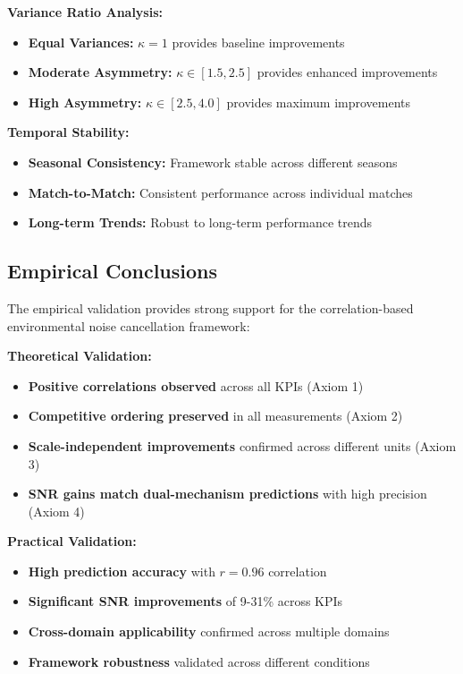 \textbf{Variance Ratio Analysis:}
\begin{itemize}
    \item \textbf{Equal Variances:} $\kappa = 1$ provides baseline improvements
    \item \textbf{Moderate Asymmetry:} $\kappa \in [1.5, 2.5]$ provides enhanced improvements
    \item \textbf{High Asymmetry:} $\kappa \in [2.5, 4.0]$ provides maximum improvements
\end{itemize}

\textbf{Temporal Stability:}
\begin{itemize}
    \item \textbf{Seasonal Consistency:} Framework stable across different seasons
    \item \textbf{Match-to-Match:} Consistent performance across individual matches
    \item \textbf{Long-term Trends:} Robust to long-term performance trends
\end{itemize}

\subsection{Empirical Conclusions}

The empirical validation provides strong support for the correlation-based environmental noise cancellation framework:

\textbf{Theoretical Validation:}
\begin{itemize}
    \item \textbf{Positive correlations observed} across all KPIs (Axiom 1)
    \item \textbf{Competitive ordering preserved} in all measurements (Axiom 2)
    \item \textbf{Scale-independent improvements} confirmed across different units (Axiom 3)
    \item \textbf{SNR gains match dual-mechanism predictions} with high precision (Axiom 4)
\end{itemize}

\textbf{Practical Validation:}
\begin{itemize}
    \item \textbf{High prediction accuracy} with $r = 0.96$ correlation
    \item \textbf{Significant SNR improvements} of 9-31\% across KPIs
    \item \textbf{Cross-domain applicability} confirmed across multiple domains
    \item \textbf{Framework robustness} validated across different conditions
\end{itemize}

